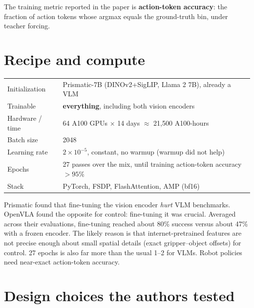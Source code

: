 \documentclass[11pt]{article}
\begin{document}
The training metric reported in the paper is \textbf{action-token accuracy}: the fraction of action tokens whose argmax equals the ground-truth bin, under teacher forcing.

\section{Recipe and compute}

\begin{center}
\begin{tabular}{@{}ll@{}}
\toprule
Initialization & Prismatic-7B (DINOv2+SigLIP, Llama 2 7B), already a VLM \\
Trainable & \textbf{everything}, including both vision encoders \\
Hardware / time & 64 A100 GPUs $\times$ 14 days $\approx$ 21{,}500 A100-hours \\
Batch size & 2048 \\
Learning rate & $2\times10^{-5}$, constant, no warmup (warmup did not help) \\
Epochs & 27 passes over the mix, until training action-token accuracy $>95\%$ \\
Stack & PyTorch, FSDP, FlashAttention, AMP (bf16) \\
\bottomrule
\end{tabular}
\end{center}

\begin{pitfall}
Prismatic found that fine-tuning the vision encoder \emph{hurt} VLM benchmarks. OpenVLA found the opposite for control: fine-tuning it was crucial. Averaged across their evaluations, fine-tuning reached about 80\% success versus about 47\% with a frozen encoder. The likely reason is that internet-pretrained features are not precise enough about small spatial details (exact gripper--object offsets) for control. 27 epochs is also far more than the usual 1--2 for VLMs. Robot policies need near-exact action-token accuracy.
\end{pitfall}

\section{Design choices the authors tested}
\end{document}
